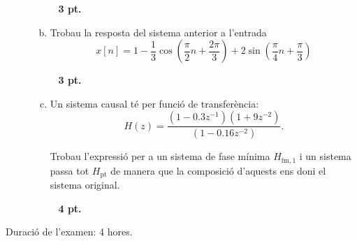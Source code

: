 \documentclass{article}
\def\pt{\text{pt}}
\def\fm{\text{fm}}
\begin{document}
\begin{description}
\begin{enumerate}[a)]
\ \hfill{\textbf{ 3 pt.}}

\item Trobau la resposta del sistema anterior a l'entrada
\[
x[n]=1-\frac{1}{3}\cos(\frac{\pi}{2}n+\frac{2\pi}{3})+2\sin(\frac{\pi}{4}n+\frac{\pi}{3})
\]

\ \hfill{\textbf{ 3 pt.}}


\item Un sistema causal té per funció de transferència:
  $$H(z)=\frac{(1-0.3z^{-1})(1+9z^{-2})}{(1-0.16z^{-2})}.$$

Trobau l'expressió per a un sistema de fase mínima $H_{\fm,1}$ i
    un sistema passa tot $H_\pt$ de manera que la composició d'aquests
    ens doni el sistema original.
    
\ \hfill{\textbf{ 4 pt.}}


\end{enumerate}

\end{description}

\vskip 0.5cm

\noindent
Duració de l'examen: 4 hores.
\end{document}
